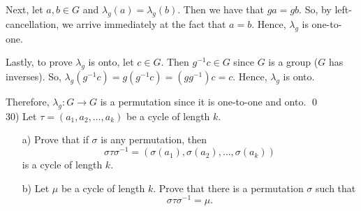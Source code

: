 \documentclass{article}
\begin{document}
Next, let $a, b \in G$ and $\lambda _g(a) = \lambda_g(b).$ Then we have that $ga = gb$. So, by left-cancellation, we arrive immediately at the fact that $a = b$. Hence, $\lambda _g$ is one-to-one.

Lastly, to prove $\lambda_g$ is onto, let $c \in G$. Then $g^{-1}c \in G$ since $G$ is a group ($G$ has inverses).  So, $\lambda_g(g^{-1}c) = g(g^{-1}c) = (gg^{-1})c = c.$ Hence, $\lambda_g$ is onto.

Therefore, $\lambda _g : G \to G$ is a permutation since it is one-to-one and onto. \qed \\

30) Let $\tau = (a_1, a_2, \ldots, a_k)$ be a cycle of length $k$.  \\
\begin{enumerate}
	\item[a)] Prove that if $\sigma$ is any permutation, then 
	\begin{equation}
		\sigma \tau \sigma^{-1} = (\sigma(a_1), \sigma(a_2), \ldots, \sigma(a_k))
	\end{equation}
is a cycle of length $k.$
	\item[b)] Let $\mu$ be a cycle of length $k.$ Prove that there is a permutation $\sigma$ such that 
$$ \sigma \tau \sigma^{-1} = \mu. $$
\end{enumerate}
\end{document}
